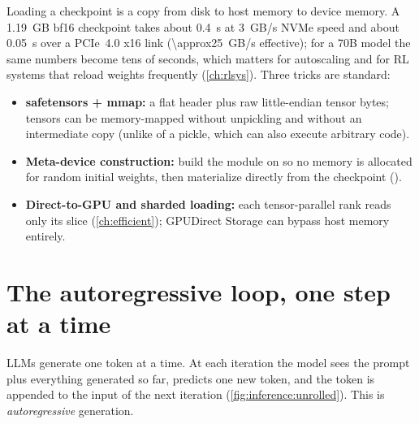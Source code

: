 \begin{systemslens}
Loading a checkpoint is a copy from disk to host memory to device memory. A \SI{1.19}{GB} bf16
checkpoint takes about \SI{0.4}{s} at \SI{3}{GB/s} NVMe speed and about \SI{0.05}{s} over a
PCIe~4.0 x16 link (\SI{\approx25}{GB/s} effective); for a 70B model the same numbers become tens of
seconds, which matters for autoscaling and for RL systems that reload weights frequently
(\cref{ch:rlsys}). Three tricks are standard:
\begin{itemize}
  \item \textbf{safetensors + mmap:} a flat header plus raw little-endian tensor bytes; tensors can
    be memory-mapped without unpickling and without an intermediate copy (unlike 
    of a pickle, which can also execute arbitrary code).
  \item \textbf{Meta-device construction:} build the module on  so no
    memory is allocated for random initial weights, then materialize directly from the checkpoint
    ().
  \item \textbf{Direct-to-GPU and sharded loading:} each tensor-parallel rank reads only its slice
    (\cref{ch:efficient}); GPUDirect Storage can bypass host memory entirely.
\end{itemize}
\end{systemslens}

\section{The autoregressive loop, one step at a time}\label{sec:inference:loop}

LLMs generate one token at a time. At each iteration the model sees the prompt plus everything
generated so far, predicts one new token, and the token is appended to the input of the next
iteration (\cref{fig:inference:unrolled}). This is \emph{autoregressive} generation.

